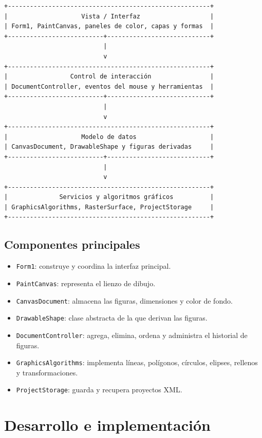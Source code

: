 \documentclass[11pt,a4paper]{report}
\begin{document}
\begin{verbatim}
+-------------------------------------------------------+
|                    Vista / Interfaz                   |
| Form1, PaintCanvas, paneles de color, capas y formas  |
+--------------------------+----------------------------+
                           |
                           v
+-------------------------------------------------------+
|                 Control de interacción                |
| DocumentController, eventos del mouse y herramientas  |
+--------------------------+----------------------------+
                           |
                           v
+-------------------------------------------------------+
|                    Modelo de datos                    |
| CanvasDocument, DrawableShape y figuras derivadas     |
+--------------------------+----------------------------+
                           |
                           v
+-------------------------------------------------------+
|              Servicios y algoritmos gráficos          |
| GraphicsAlgorithms, RasterSurface, ProjectStorage     |
+-------------------------------------------------------+
\end{verbatim}

\section{Componentes principales}

\begin{itemize}
    \item \texttt{Form1}: construye y coordina la interfaz principal.
    \item \texttt{PaintCanvas}: representa el lienzo de dibujo.
    \item \texttt{CanvasDocument}: almacena las figuras, dimensiones y color de fondo.
    \item \texttt{DrawableShape}: clase abstracta de la que derivan las figuras.
    \item \texttt{DocumentController}: agrega, elimina, ordena y administra el historial de figuras.
    \item \texttt{GraphicsAlgorithms}: implementa líneas, polígonos, círculos, elipses, rellenos y transformaciones.
    \item \texttt{ProjectStorage}: guarda y recupera proyectos XML.
\end{itemize}

\chapter{Desarrollo e implementación}
\end{document}
